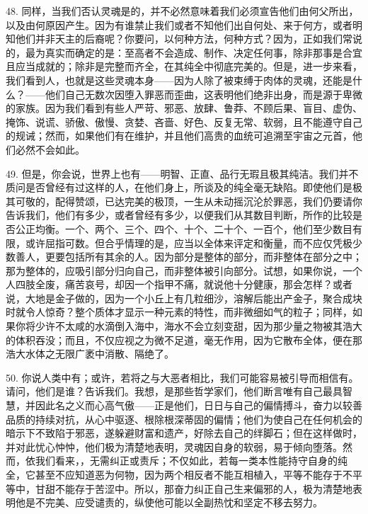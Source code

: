48. 同样，当我们否认灵魂是的，并不必然意味着我们必须宣告他们由何父所出，以及由何原因产生。因为有谁禁止我们或者不知他们出自何处、来于何方，或者明知他们并非天主的后裔呢？你要问，以何种方法，何种方式？因为，正如我们常说的，最为真实而确定的是：至高者不会造成、制作、决定任何事，除非那事是合宜且应当成就的；除非是完整而齐全，在其纯全中彻底完美的。但是，进一步来看，我们看到人，也就是这些灵魂本身——因为人除了被束缚于肉体的灵魂，还能是什么？——他们自己无数次因堕入罪恶而歪曲，这表明他们绝非出身，而是源于卑微的家族。因为我们看到有些人严苛、邪恶、放肆、鲁莽、不顾后果、盲目、虚伪、掩饰、说谎、骄傲、傲慢、贪婪、吝啬、好色、反复无常、软弱，且不能遵守自己的规诫；然而，如果他们有在维护，并且他们高贵的血统可追溯至宇宙之元首，他们必然不会如此。\par

49. 但是，你会说，世界上也有——明智、正直、品行无瑕且极其纯洁。我们并不质问是否曾经有过这样的人，在他们身上，所谈及的纯全毫无缺陷。即使他们是极其可敬的，配得赞颂，已达完美的极顶，一生从未动摇沉沦於罪恶，我们仍要请你告诉我们，他们有多少，或者曾经有多少，以便我们从其数目判断，所作的比较是否公正均衡。一个、两个、三个、四个、十个、二十个、一百个，他们至少数目有限，或许屈指可数。但合乎情理的是，应当以全体来评定和衡量，而不应仅凭极少数善人，更要包括所有其余的人。因为部分是整体的部分，而非整体在部分之中；那为整体的，应吸引部分归向自己，而非整体被引向部分。试想，如果你说，一个人四肢全废，痛苦哀号，却因一个指甲不痛，就说他十分健康，那会怎样？或者说，大地是金子做的，因为一个小丘上有几粒细沙，溶解后能出产金子，聚合成块时就令人惊奇？整个质体才显示一种元素的特性，而非微细如气的粒子；同样，如果你将少许不太咸的水滴倒入海中，海水不会立刻变甜，因为那少量之物被其浩大的体积吞没；而且，不仅应视之为微不足道，毫无作用，因为它散布全体，便在那浩大水体之无限广袤中消散、隔绝了。\par

50. 你说人类中有；或许，若将之与大恶者相比，我们可能容易被引导而相信有。请问，他们是谁？告诉我们。我想，是那些哲学家们，他们断言唯有自己最具智慧，并因此名之义而心高气傲——正是他们，日日与自己的偏情搏斗，奋力以较善品质的持续对抗，从心中驱逐、根除根深蒂固的偏情；他们为使自己在任何机会的暗示下不致陷于邪恶，遂躲避财富和遗产，好除去自己的绊脚石；但在这样做时，并对此忧心忡忡，他们极为清楚地表明，灵魂因自身的软弱，易于倾向堕落。然而，依我们看来，，无需纠正或责斥；不仅如此，若每一类本性能持守自身的纯全，它甚至不应知道恶为何物，因为两个相反者不能互相植入，平等不能存于不平等中，甘甜不能存于苦涩中。所以，那奋力纠正自己生来偏邪的人，极为清楚地表明他是不完美、应受谴责的，纵使他可能以全副热忱和坚定不移去努力。\par

